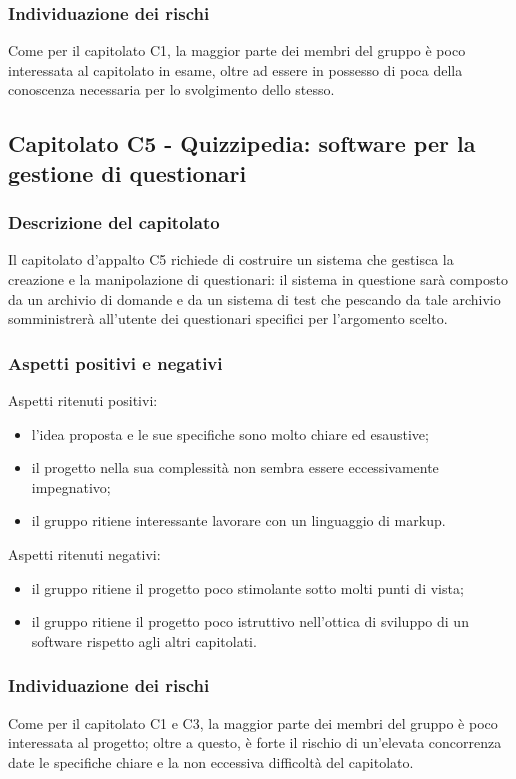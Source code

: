 \documentclass[../StudioDiFattibilita.tex]{subfiles}
\begin{document}
		\subsubsection{Individuazione dei rischi}
		Come per il capitolato C1, la maggior parte dei membri del gruppo è poco interessata al capitolato in esame, oltre ad essere in possesso di poca della conoscenza necessaria per lo svolgimento dello stesso.
	\subsection{Capitolato C5 - Quizzipedia: software per la gestione di questionari}
		\subsubsection{Descrizione del capitolato}
		Il capitolato d'appalto C5 richiede di costruire un sistema che gestisca la creazione e la manipolazione di questionari: il sistema in questione sarà composto da un archivio di domande e da un sistema di test che pescando da tale archivio somministrerà all'utente dei questionari specifici per l'argomento scelto.
		\subsubsection{Aspetti positivi e negativi}
		Aspetti ritenuti positivi:
			\begin{itemize}
				\item l'idea proposta e le sue specifiche sono molto chiare ed esaustive;
				\item il progetto nella sua complessità non sembra essere eccessivamente impegnativo;
				\item il gruppo ritiene interessante lavorare con un linguaggio di markup.
			\end{itemize}
		Aspetti ritenuti negativi:
			\begin{itemize}
				\item il gruppo ritiene il progetto poco stimolante sotto molti punti di vista;
				\item il gruppo ritiene il progetto poco istruttivo nell'ottica di sviluppo di un software rispetto agli altri capitolati.
			\end{itemize}
		\subsubsection{Individuazione dei rischi}
		Come per il capitolato C1 e C3, la maggior parte dei membri del gruppo è poco interessata al progetto; oltre a questo, è forte il rischio di un'elevata concorrenza date le specifiche chiare e la non eccessiva difficoltà del capitolato.
\end{document}
